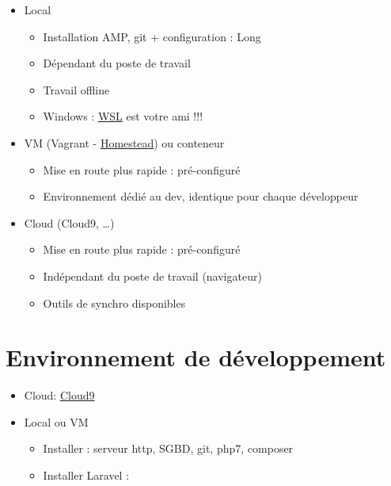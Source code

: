 \begin{itemize}
\tightlist
\item
  Local

  \begin{itemize}
  \tightlist
  \item
    Installation AMP, git + configuration : Long
  \item
    Dépendant du poste de travail
  \item
    Travail offline
  \item
    Windows :
    \href{https://docs.microsoft.com/en-us/windows/wsl/install-win10}{WSL}
    est votre ami !!!
  \end{itemize}
\item
  VM (Vagrant -
  \href{https://laravel.com/docs/5.7/homestead}{Homestead}) ou conteneur

  \begin{itemize}
  \tightlist
  \item
    Mise en route plus rapide : pré-configuré
  \item
    Environnement dédié au dev, identique pour chaque développeur
  \end{itemize}
\item
  Cloud (Cloud9, \ldots{})

  \begin{itemize}
  \tightlist
  \item
    Mise en route plus rapide : pré-configuré
  \item
    Indépendant du poste de travail (navigateur)
  \item
    Outils de synchro disponibles
  \end{itemize}
\end{itemize}

\hypertarget{environnement-de-duxe9veloppement-1}{%
\section{Environnement de
développement}\label{environnement-de-duxe9veloppement-1}}

\begin{itemize}
\tightlist
\item
  Cloud:
  \href{https://github.com/dev-nowornet/Laravel-5.6-Complete-Install-Cloud9-C9}{Cloud9}
\item
  Local ou VM

  \begin{itemize}
  \tightlist
  \item
    Installer : serveur http, SGBD, git, php7, composer
  \item
    Installer Laravel :
  \end{itemize}
\end{itemize}

